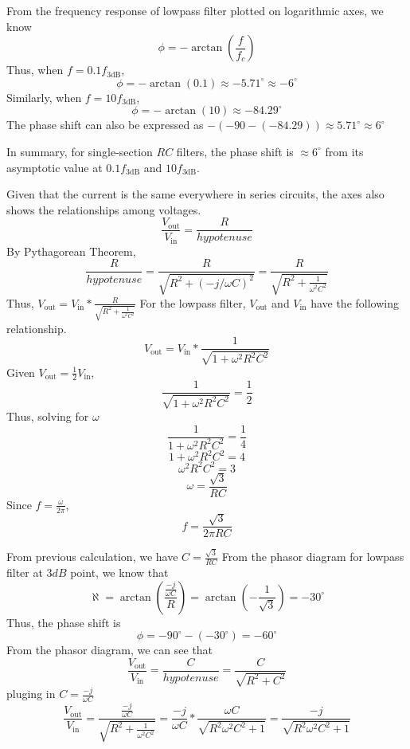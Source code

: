 From the frequency response of lowpass filter plotted on logarithmic axes, we know
\[\phi = -\arctan(\frac{f}{f_c})\]
Thus, when $f = 0.1f_\text{3dB}$, 
\[\phi = -\arctan(0.1) \approx -5.71 ^\circ \approx -6^\circ\]
Similarly, when $f = 10f_\text{3dB}$, 
\[\phi = -\arctan(10) \approx -84.29 ^\circ\]
The phase shift can also be expressed as $-(-90 - (-84.29)) \approx 5.71 ^\circ \approx 6^\circ $

In summary, for single-section $RC$ filters, the phase shift is $\approx 6^\circ$ from its asymptotic value at $0.1f_\text{3dB}$ and $10f_\text{3dB}$.

Given that the current is the same everywhere in series circuits, the axes also shows the relationships among voltages. 
\[\frac{V_\text{out}}{V_\text{in}} = \frac{R}{hypotenuse}\]
By Pythagorean Theorem, 
\[\frac{R}{hypotenuse} = \frac{R}{\sqrt{R^2 + (-j/\omega C)^2}} = \frac{R}{\sqrt{R^2 + \frac{1}{\omega^2 C^2}}}\]
Thus, $V_\text{out} = V_\text{in} * \frac{R}{\sqrt{R^2 + \frac{1}{\omega^2 C^2}}}$
    For the lowpass filter, $V_\text{out}$ and $V_\text{in}$ have the following relationship.
    \[V_\text{out} = V_\text{in} * \frac{1}{\sqrt{1+\omega ^2 R^2 C^2}}\]
    Given $V_\text{out} = \frac{1}{2} V_\text{in}$, 
    \[\frac{1}{\sqrt{1+\omega ^2 R^2 C^2}} = \frac{1}{2}\]
    Thus, solving for $\omega$
    \[\frac{1}{1+\omega^2 R^2 C^2} = \frac{1}{4}\]
    \[1+\omega^2 R^2 C^2 = 4\]
    \[\omega^2 R^2 C^2 = 3\]
    \[\omega = \frac{\sqrt{3}}{RC}\]
    Since $f = \frac{\omega}{2\pi}$,
    \[f = \frac{\sqrt{3}}{2\pi RC}\]

    From previous calculation, we have $C = \frac{\sqrt{3}}{RC}$
    From the phasor diagram for lowpass filter at $3dB$ point, we know that 
    \[\aleph = \arctan(\frac{\frac{-j}{\omega C}}{R}) =\arctan(-\frac{1}{\sqrt{3}}) = -30^\circ\]
    Thus, the phase shift is 
    \[\phi = -90^\circ - (-30^\circ) = -60^\circ\] 
    From the phasor diagram, we can see that 
    \[\frac{V_\text{out}}{V_\text{in}} = \frac{C}{hypotenuse}= \frac{C}{\sqrt{R^2 + C^2}}\]
    pluging in $ C = \frac{-j}{\omega C}$
    \[\frac{V_\text{out}}{V_\text{in}} = \frac{\frac{-j}{\omega C}}{\sqrt{R^2 + \frac{1}{\omega^2 C^2}}} = \frac{-j}{\omega C} * \frac{\omega C}{\sqrt{R^2 \omega^2 C^2+1}}
        = \frac{-j}{\sqrt{R^2 \omega^2 C^2+1}}\]
    
